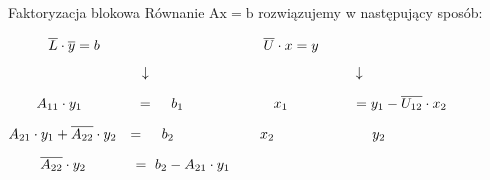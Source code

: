 \begin{frame}{Faktoryzacja blokowa}
Równanie $\mathrm{A}\mathrm{x}=\mathrm{b}$ rozwiązujemy w następujący sposób:\\

\vspace{0.5cm}

$\hspace*{10mm} \overline{L}\cdot\overline{y}=b\  \hspace*{40mm}\overline{U}\cdot x=y$

$\hspace*{33.5mm}\downarrow\ \hspace*{51mm} \downarrow$

$\hspace*{7mm}A_{11}\cdot y_{1}\ \hspace*{12.4mm} =\ \hspace*{3mm} b_{1}\ \hspace*{21.5mm} x_{1}\ \hspace*{15mm} = y_{1}-\overline{U_{12}}\cdot x_{2}$

$A_{21}\cdot y_{1}+\overline{A_{22}}\cdot y_{2}\hspace*{2.5mm} =\ \hspace*{3mm} b_{2}\ \hspace*{20.5mm} x_{2}\ \hspace*{23.5mm} y_{2} $

$\hspace*{8mm} \overline{A_{22}}\cdot y_{2} \hspace*{11.5mm} =\ b_{2}-A_{21}\cdot y_{1}\ $




\end{frame}